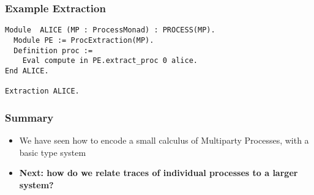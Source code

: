 \begin{frame}[fragile]
\frametitle{Example Extraction}
\begin{verbatim}
Module  ALICE (MP : ProcessMonad) : PROCESS(MP).
  Module PE := ProcExtraction(MP).
  Definition proc :=
    Eval compute in PE.extract_proc 0 alice.
End ALICE.

Extraction ALICE.
\end{verbatim}
\end{frame}

\begin{frame}[fragile]
\frametitle{Summary}
\begin{sticky}
\begin{itemize}
\item We have seen how to encode a small calculus of Multiparty Processes, with a basic type system
\item \textbf{Next: how do we relate traces of individual processes to a larger system?}
\end{itemize}
\end{sticky}
\end{frame}
